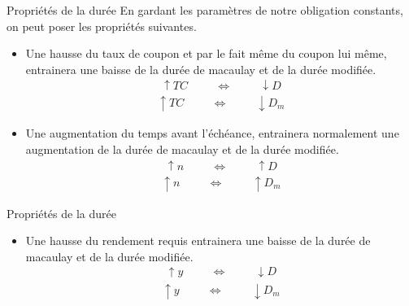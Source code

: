\documentclass{beamer}
\begin{document}
\begin{frame}{Propriétés de la durée}
En gardant les paramètres de notre obligation constants,  on peut poser les propriétés suivantes.
\begin{itemize}
\item Une hausse du taux de coupon et par le fait même du coupon lui même, entrainera une baisse de la durée de macaulay et de la durée modifiée.
\begin{align*}
\uparrow TC \hspace{1cm} \Longleftrightarrow \hspace{1cm} \downarrow D 
\end{align*}
\begin{align*}
\uparrow TC \hspace{1cm} \Longleftrightarrow \hspace{1cm} \downarrow D_m 
\end{align*}
\item Une augmentation du temps avant l'échéance, entrainera normalement une augmentation de la durée de macaulay et de la durée modifiée.
\begin{align*}
\uparrow n \hspace{1cm} \Longleftrightarrow \hspace{1cm} \uparrow D 
\end{align*}
\begin{align*}
\uparrow n \hspace{1cm} \Longleftrightarrow \hspace{1cm} \uparrow D_m 
\end{align*}

\end{itemize}
\end{frame}

\begin{frame}{Propriétés de la durée}
\begin{itemize}
\item Une hausse du rendement requis entrainera une baisse de la durée de macaulay et de la durée modifiée.
\begin{align*}
\uparrow y \hspace{1cm} \Longleftrightarrow \hspace{1cm} \downarrow D 
\end{align*}
\begin{align*}
\uparrow y \hspace{1cm} \Longleftrightarrow \hspace{1cm} \downarrow D_m 
\end{align*}
\end{itemize}
\end{frame}
\end{document}
